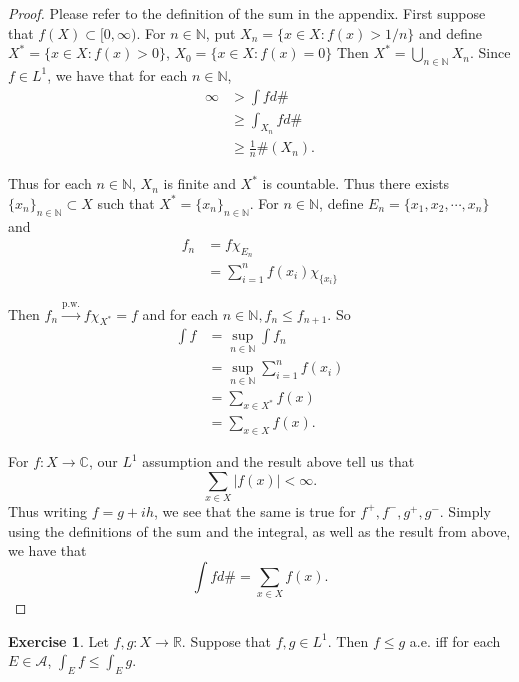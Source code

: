 \documentclass[12pt]{amsart}
\theoremstyle{definition}
\newtheorem{ex}[definition]{Exercise}
\newcommand{\C}{\mathbb{C}}
\newcommand{\N}{\mathbb{N}}
\newcommand{\R}{\mathbb{R}}
\newcommand{\MA}{\mathcal{A}}
\newcommand{\Rg}{[0,\infty)}
\begin{document}
	\begin{proof}
		Please refer to the definition of the sum in the appendix. First suppose that $f(X) \subset \Rg$. For $n \in \N$, put $X_n = \{x \in X: f(x) > 1/n\}$ and define $X^* = \{x \in X: f(x) > 0\}$, $X_0 = \{x \in X: f(x) = 0\}$ Then $X^* = \bigcup\limits_{n \in \N}X_n$. Since $f \in L^1$, we have that for each $n \in \N$,
		\begin{align*}
			\infty 
			&> \int f d\#\\
			&\geq \int_{X_n} f d\# \\
			&\geq \frac{1}{n} \#(X_n).
		\end{align*}
		
		Thus for each $n \in \N$, $X_n$ is finite and $X^*$ is countable. Thus there exists $\{x_n\}_{n \in \N} \subset X$ such that $X^* = \{x_n\}_{n \in \N}$. For $n \in \N$, define $E_n = \{x_1, x_2, \cdots, x_n\}$ and 
		\begin{align*}
			f_n 
			&= f \chi_{E_n}\\
			&= \sum_{i = 1}^n f(x_i)\chi_{\{x_i\}}
		\end{align*}
		
		Then $f_n \xrightarrow{\text{p.w.}} f\chi_{X^*} = f$ and for each $n \in \N, f_n \leq f_{n+1}$. So
		\begin{align*}
			\int f 
			&= \sup_{n \in \N} \int f_n\\
			&= \sup_{n \in \N} \sum_{i =1}^n f(x_i)\\
			&= \sum_{x \in X^*} f(x)\\
			&=\sum_{x \in X} f(x).
		\end{align*} 
		
		For $f:X \rightarrow \C$, our $L^1$ assumption and the result above tell us that $$\sum_{x \in X}|f(x)| < \infty.$$ Thus writing $f = g+ih$, we see that the same is true for $f^+,f^-,g^+,g^-$. Simply using the definitions of the sum and the integral, as well as the result from above, we have that $$\int fd\# = \sum_{x \in X}f(x).$$
		
	\end{proof}
	
	\begin{ex}
		Let $f,g:X \rightarrow \R$. Suppose that $f,g \in L^1$. Then $f \leq g$ a.e. iff for each $E \in \MA$, $\int_E f \leq \int_E g$.  
	\end{ex}
	
\end{document}
